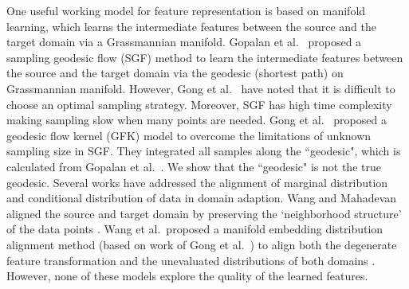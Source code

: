 \documentclass[10pt, conference, compsocconf]{IEEEtran}
\begin{document}
One useful working model for feature representation is based on manifold learning, which learns the intermediate features between the source and the target domain via a Grassmannian manifold.  Gopalan et al.\ \cite{gopalan2011domain} proposed a sampling geodesic flow (SGF) method to learn the intermediate features between the source and the target domain via the geodesic (shortest path) on Grassmannian manifold. However, Gong et al.\ \cite{gong2012geodesic} have noted that it is difficult to choose an optimal sampling strategy. Moreover, SGF has high time complexity making sampling slow when many points are needed. Gong et al.~\cite{gong2012geodesic} proposed a geodesic flow kernel (GFK) model to overcome the limitations of unknown sampling size in SGF. 
They integrated all samples along the ``geodesic", which is calculated from Gopalan et al.\ \cite{gopalan2011domain}. We show that the ``geodesic" is not the true geodesic. Several works have addressed the alignment of marginal distribution and conditional distribution of data in domain adaption. Wang and Mahadevan aligned the source and target domain by preserving the ‘neighborhood structure’ of the data   points \cite{wang2009manifold}.  Wang et al.\ proposed a manifold embedding distribution alignment method (based on work of Gong et al.~\cite{gong2012geodesic}) to align both the degenerate feature transformation and the unevaluated distributions of both domains \cite{wang2018visual}. However, none of these models explore the quality of the learned features.
\end{document}
